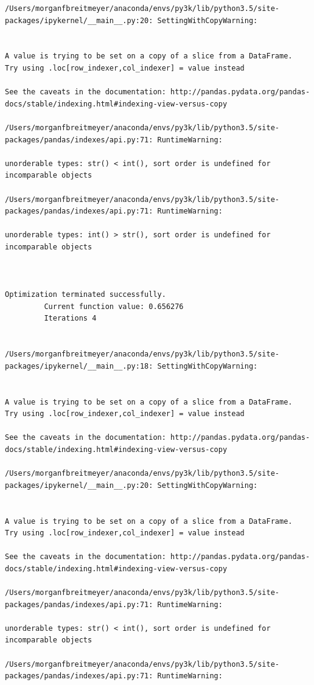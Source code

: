 \begin{lstlisting}
/Users/morganfbreitmeyer/anaconda/envs/py3k/lib/python3.5/site-packages/ipykernel/__main__.py:20: SettingWithCopyWarning:


A value is trying to be set on a copy of a slice from a DataFrame.
Try using .loc[row_indexer,col_indexer] = value instead

See the caveats in the documentation: http://pandas.pydata.org/pandas-docs/stable/indexing.html#indexing-view-versus-copy

/Users/morganfbreitmeyer/anaconda/envs/py3k/lib/python3.5/site-packages/pandas/indexes/api.py:71: RuntimeWarning:

unorderable types: str() < int(), sort order is undefined for incomparable objects

/Users/morganfbreitmeyer/anaconda/envs/py3k/lib/python3.5/site-packages/pandas/indexes/api.py:71: RuntimeWarning:

unorderable types: int() > str(), sort order is undefined for incomparable objects



Optimization terminated successfully.
         Current function value: 0.656276
         Iterations 4


/Users/morganfbreitmeyer/anaconda/envs/py3k/lib/python3.5/site-packages/ipykernel/__main__.py:18: SettingWithCopyWarning:


A value is trying to be set on a copy of a slice from a DataFrame.
Try using .loc[row_indexer,col_indexer] = value instead

See the caveats in the documentation: http://pandas.pydata.org/pandas-docs/stable/indexing.html#indexing-view-versus-copy

/Users/morganfbreitmeyer/anaconda/envs/py3k/lib/python3.5/site-packages/ipykernel/__main__.py:20: SettingWithCopyWarning:


A value is trying to be set on a copy of a slice from a DataFrame.
Try using .loc[row_indexer,col_indexer] = value instead

See the caveats in the documentation: http://pandas.pydata.org/pandas-docs/stable/indexing.html#indexing-view-versus-copy

/Users/morganfbreitmeyer/anaconda/envs/py3k/lib/python3.5/site-packages/pandas/indexes/api.py:71: RuntimeWarning:

unorderable types: str() < int(), sort order is undefined for incomparable objects

/Users/morganfbreitmeyer/anaconda/envs/py3k/lib/python3.5/site-packages/pandas/indexes/api.py:71: RuntimeWarning:


\end{lstlisting}
